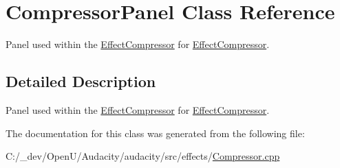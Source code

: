 \hypertarget{class_compressor_panel}{}\section{Compressor\+Panel Class Reference}
\label{class_compressor_panel}


Panel used within the \hyperlink{class_effect_compressor}{Effect\+Compressor} for \hyperlink{class_effect_compressor}{Effect\+Compressor}.  




\subsection{Detailed Description}
Panel used within the \hyperlink{class_effect_compressor}{Effect\+Compressor} for \hyperlink{class_effect_compressor}{Effect\+Compressor}. 

The documentation for this class was generated from the following file\+:\begin{DoxyCompactItemize}
\item 
C\+:/\+\_\+dev/\+Open\+U/\+Audacity/audacity/src/effects/\hyperlink{_compressor_8cpp}{Compressor.\+cpp}\end{DoxyCompactItemize}

